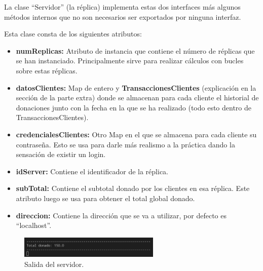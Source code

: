 \documentclass{article}
\begin{document}
La clase ``Servidor'' (la réplica) implementa estas dos interfaces más algunos métodos internos que no son necesarios ser exportados por ninguna interfaz.


Esta clase consta de los siguientes atributos:
\begin{itemize}
    \item \textbf{numReplicas: }Atributo de instancia que contiene el número de réplicas que se han instanciado. Principalmente sirve para realizar cálculos con bucles sobre estas réplicas.
    
    \item \textbf{datosClientes: }Map de entero y \textbf{TransaccionesClientes} (explicación en la sección de la parte extra) donde se almacenan para cada cliente el historial de donaciones junto con la fecha en la que se ha realizado (todo esto dentro de TransaccionesClientes).
    \item \textbf{credencialesClientes: }Otro Map en el que se almacena para cada cliente su contraseña. Esto se usa para darle más realismo a la práctica dando la sensación de existir un login.
    \item \textbf{idServer: }Contiene el identificador de la réplica.
    \item \textbf{subTotal: }Contiene el subtotal donado por los clientes en esa réplica. Este atributo luego se usa para obtener el total global donado. 
    \item \textbf{direccion: }Contiene la dirección que se va a utilizar, por defecto es ``localhost''.
\end{itemize}

\begin{figure}[H]
    \centering
    \includegraphics[width=0.6\textwidth]{imagenes/donObligatorioServer.png}
    \caption{Salida del servidor.}
\end{figure}
\end{document}

